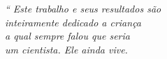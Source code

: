 \begin{epigrafe}
	\vspace*{\fill}
	\begin{flushright}
		\textit{``
		Este trabalho e seus resultados são
		\\ inteiramente dedicado a criança
		\\ a qual sempre falou que seria 
		\\ um cientista. Ele ainda vive.}
	\end{flushright}
\end{epigrafe}
